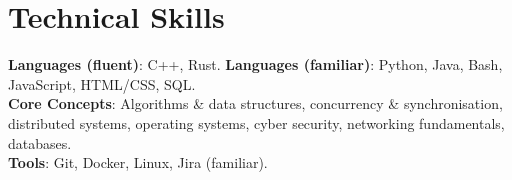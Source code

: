 \section{Technical Skills}
\begin{itemize}[leftmargin=0.15in, label={}]
  \small{\item{
    \textbf{Languages (fluent)}: C++, Rust. \quad \quad
    \textbf{Languages (familiar)}: Python, Java, Bash, JavaScript, HTML/CSS, SQL. \\
    \textbf{Core Concepts}: Algorithms \& data structures, concurrency \& synchronisation, distributed systems, operating systems, cyber security, networking fundamentals, databases. \\
    \textbf{Tools}: Git, Docker, Linux, Jira (familiar).
  }}
\end{itemize}
